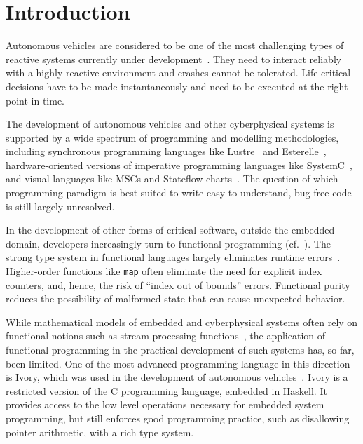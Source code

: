 \section{Introduction}

Autonomous vehicles are considered to be one of the most challenging
types of reactive systems currently under development~\cite{AlurMT16,
  WongpiromsarnKF11, RamanDSMS15}. They need to interact reliably with
a highly reactive environment and crashes cannot be tolerated.  Life
critical decisions have to be made instantaneously and need to be
executed at the right point in time.

The development of autonomous vehicles and other cyberphysical systems
is supported by a wide spectrum of
programming and modelling methodologies, 
including synchronous programming languages like Lustre~\cite{conf/popl/CaspiPHP87} 
and Esterelle~\cite{conf/concur/BerryC84},
hardware-oriented versions of imperative programming languages like
SystemC~\cite{open2006ieee}, and visual languages like MSCs and Stateflow-charts~\cite{harel2003message,journals/scp/Harel87}.
The question of which programming paradigm is best-suited to write
easy-to-understand, bug-free code is still largely unresolved.

In the development of other forms of critical software, outside the
embedded domain, developers increasingly turn to functional
programming (cf.~\cite{frankau2009commercial}).  The strong type system in functional
languages largely eliminates runtime errors~\cite{cardelli1996type}.
Higher-order functions like \texttt{map} often eliminate the need for
explicit index counters, and, hence, the risk of ``index out of
bounds'' errors.  Functional purity reduces the possibility of
malformed state that can cause unexpected behavior.

While mathematical models of embedded and cyberphysical systems often
rely on functional notions such as stream-processing
functions~\cite{series/mcs/BroyS01,conf/csdm/Broy12}, the
application of functional programming in the practical development of
such systems has, so far, been limited. One of the most advanced
programming language in this direction is Ivory, which was used in the
development of autonomous vehicles~\cite{pike2014}.  Ivory is a
restricted version of the C programming language, embedded in Haskell.
It provides access to the low level operations necessary for embedded
system programming, but still enforces good programming practice, such
as disallowing pointer arithmetic, with a rich type system.

